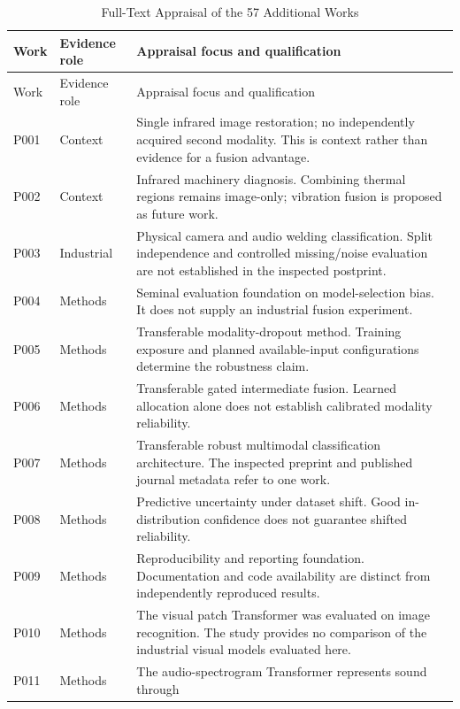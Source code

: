 \begingroup\small
\begin{longtable}{@{}P{.25\textwidth}P{.16\textwidth}P{.53\textwidth}@{}}
\caption{Full-Text Appraisal of the 57 Additional Works}\label{tab:expanded-register}\\
\toprule Work & Evidence role & Appraisal focus and qualification \\
\midrule\endfirsthead
\toprule Work & Evidence role & Appraisal focus and qualification \\
\midrule\endhead
P001 \citep{P001} & Context & Single infrared image restoration; no independently
acquired second modality. This is context rather than evidence for a fusion advantage.
\\
P002 \citep{P002} & Context & Infrared machinery diagnosis. Combining thermal regions
remains image-only; vibration fusion is proposed as future work. \\
P003 \citep{P003} & Industrial & Physical camera and audio welding classification. Split
independence and controlled missing/noise evaluation are not established in the
inspected postprint. \\
P004 \citep{P004} & Methods & Seminal evaluation foundation on model-selection bias. It
does not supply an industrial fusion experiment. \\
P005 \citep{P005} & Methods & Transferable modality-dropout method. Training exposure
and planned available-input configurations determine the robustness claim. \\
P006 \citep{P006} & Methods & Transferable gated intermediate fusion. Learned allocation
alone does not establish calibrated modality reliability. \\
P007 \citep{P007} & Methods & Transferable robust multimodal classification
architecture. The inspected preprint and published journal metadata refer to one work.
\\
P008 \citep{P008} & Methods & Predictive uncertainty under dataset shift. Good
in-distribution confidence does not guarantee shifted reliability. \\
P009 \citep{P009} & Methods & Reproducibility and reporting foundation. Documentation
and code availability are distinct from independently reproduced results. \\
P010 \citep{P010} & Methods & The visual patch Transformer was evaluated on image
recognition. The study provides no comparison of the industrial visual models evaluated
here. \\
P011 \citep{P011} & Methods & The audio-spectrogram Transformer represents sound through

\end{longtable}
